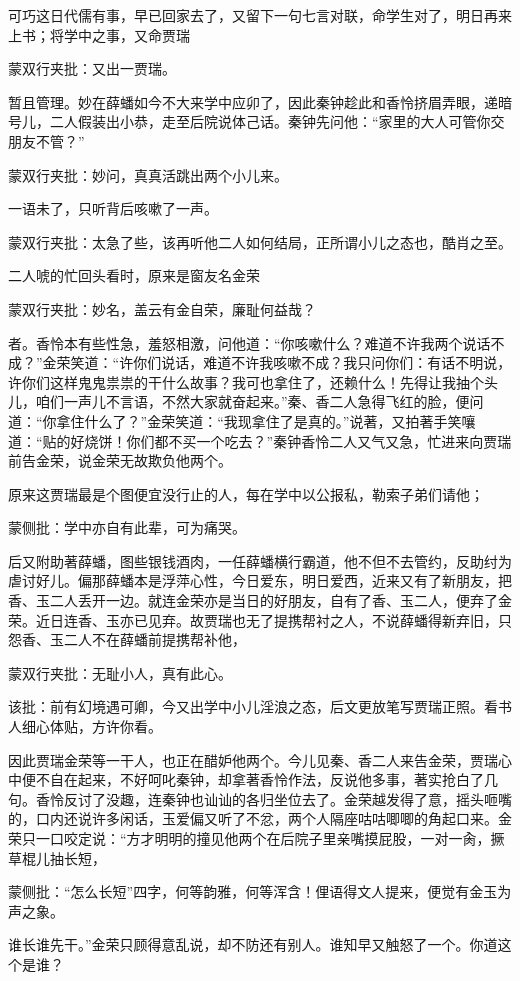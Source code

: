 \begin{parag}


    可巧这日代儒有事，早已回家去了，又留下一句七言对联，命学生对了，明日再来上书；将学中之事，又命贾瑞\begin{note}蒙双行夹批：又出一贾瑞。\end{note}暂且管理。妙在薛蟠如今不大来学中应卯了，因此秦钟趁此和香怜挤眉弄眼，递暗号儿，二人假装出小恭，走至后院说体己话。秦钟先问他：“家里的大人可管你交朋友不管？”\begin{note}蒙双行夹批：妙问，真真活跳出两个小儿来。\end{note}一语未了，只听背后咳嗽了一声。\begin{note}蒙双行夹批：太急了些，该再听他二人如何结局，正所谓小儿之态也，酷肖之至。\end{note}二人唬的忙回头看时，原来是窗友名金荣\begin{note}蒙双行夹批：妙名，盖云有金自荣，廉耻何益哉？\end{note}者。香怜本有些性急，羞怒相激，问他道：“你咳嗽什么？难道不许我两个说话不成？”金荣笑道：“许你们说话，难道不许我咳嗽不成？我只问你们：有话不明说，许你们这样鬼鬼祟祟的干什么故事？我可也拿住了，还赖什么！先得让我抽个头儿，咱们一声儿不言语，不然大家就奋起来。”秦、香二人急得飞红的脸，便问道：“你拿住什么了？”金荣笑道：“我现拿住了是真的。”说著，又拍著手笑嚷道：“贴的好烧饼！你们都不买一个吃去？”秦钟香怜二人又气又急，忙进来向贾瑞前告金荣，说金荣无故欺负他两个。
\end{parag}


\begin{parag}


    原来这贾瑞最是个图便宜没行止的人，每在学中以公报私，勒索子弟们请他；\begin{note}蒙侧批：学中亦自有此辈，可为痛哭。\end{note}后又附助著薛蟠，图些银钱酒肉，一任薛蟠横行霸道，他不但不去管约，反助纣为虐讨好儿。偏那薛蟠本是浮萍心性，今日爱东，明日爱西，近来又有了新朋友，把香、玉二人丢开一边。就连金荣亦是当日的好朋友，自有了香、玉二人，便弃了金荣。近日连香、玉亦已见弃。故贾瑞也无了提携帮衬之人，不说薛蟠得新弃旧，只怨香、玉二人不在薛蟠前提携帮补他，\begin{note}蒙双行夹批：无耻小人，真有此心。\end{note}\begin{note}该批：前有幻境遇可卿，今又出学中小儿淫浪之态，后文更放笔写贾瑞正照。看书人细心体贴，方许你看。\end{note}因此贾瑞金荣等一干人，也正在醋妒他两个。今儿见秦、香二人来告金荣，贾瑞心中便不自在起来，不好呵叱秦钟，却拿著香怜作法，反说他多事，著实抢白了几句。香怜反讨了没趣，连秦钟也讪讪的各归坐位去了。金荣越发得了意，摇头咂嘴的，口内还说许多闲话，玉爱偏又听了不忿，两个人隔座咕咕唧唧的角起口来。金荣只一口咬定说：“方才明明的撞见他两个在后院子里亲嘴摸屁股，一对一肏，撅草棍儿抽长短，\begin{note}蒙侧批：“怎么长短”四字，何等韵雅，何等浑含！俚语得文人提来，便觉有金玉为声之象。\end{note}谁长谁先干。”金荣只顾得意乱说，却不防还有别人。谁知早又触怒了一个。你道这个是谁？
\end{parag}



